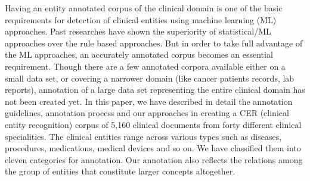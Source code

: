 Having an entity annotated corpus of the clinical domain is one of the basic requirements for detection of clinical entities using machine learning (ML) approaches. Past researches have shown the superiority of statistical/ML approaches over the rule based approaches. But in order to take full advantage of the ML approaches, an accurately annotated corpus becomes an essential requirement. Though there are a few annotated corpora available either on a small data set, or covering a narrower domain (like cancer patients records, lab reports), annotation of a large data set representing the entire clinical domain has not been created yet. In this paper, we have described in detail the annotation guidelines, annotation process and our approaches in creating a CER (clinical entity recognition) corpus of 5,160 clinical documents from forty different clinical specialities. The clinical entities range across various types such as diseases, procedures, medications, medical devices and so on. We have classified them into eleven categories for annotation. Our annotation also reflects the relations among the group of entities that constitute larger concepts altogether.
